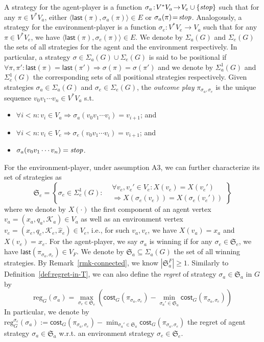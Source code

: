 \documentclass{ifacconf}
\def \K{\mathcal{K}}
\def \<{\langle}
\def \>{\rangle}
\def \stop{\emph{\text{stop}}}
\def \reg{\text{reg}}
\def \cost{\textsf{cost}}
\def \S{\mathfrak{S}}
\begin{document}
A strategy for the agent-player is a function 
$\sigma_a\!:\!  V^*V_a \!\to\! V_e \cup\{\stop\}$ 
such that for any $\pi \!\in\! V^*V_a$, either $\< \textsf{last}(\pi),\sigma_a(\pi) \>\!\in\! E$ or $\sigma_a(\pi)\!=\!\stop$.
Analogously, a strategy for the environment-player is a function $\sigma_e\!:\! V^*V_e\!\to\! V_a$ such that for any $\pi\!\in\! V^* V_e$, we have $\< \textsf{last}(\pi),\sigma_e(\pi) \>\!\in\! E$.
We denote by $\Sigma_a(G)$ and $\Sigma_e(G)$ the sets of all strategies for the agent and the environment respectively.
In particular, a strategy $\sigma\in\Sigma_a(G)\cup\Sigma_e(G)$ is said to be positional if $\forall \pi,\pi'\!:\!\textsf{last}(\pi)\!=\!\textsf{last}(\pi')\Rightarrow \sigma(\pi)\!=\!\sigma(\pi')$ and we denote by $\Sigma_a^1(G)$ and $\Sigma_e^1(G)$ the corresponding sets of all positional strategies respectively. 
Given strategies $\sigma_a\!\in\!\Sigma_a(G)$ and $\sigma_e\!\in\!\Sigma_e(G)$, the \emph{outcome play} $\pi_{\sigma_a,\sigma_e}$ is the unique sequence 
$v_0v_1\cdots v_n\!\in\! V^* V_a$ s.t.\
\begin{itemize}
    \item 
    $\forall i<n: v_i\in V_a \Rightarrow \sigma_a(v_0v_1\cdots v_i) =v_{i+1}$; and
    \item 
    $\forall i<n: v_i\in V_e\Rightarrow \sigma_e(v_0v_1\cdots v_i) =v_{i+1}$; and
    \item 
    $\sigma_a(v_0v_1\cdots v_n)=\stop$.  
\end{itemize}
For the environment-player, under assumption A3, we can further characterize its set of strategies as
\begin{equation}
    \S_e=\left\{
    \sigma_e\in\Sigma_e^1(G): 
    \begin{aligned}
    &\forall v_e,v_e'\in V_e:X(v_e)=X(v_e')\\
    &\Rightarrow X(\sigma_e(v_e))=X(\sigma_e(v_e'))
    \end{aligned}
    \right\}
\end{equation}
where we denote by $X(\cdot)$ the first component of an agent vertex $v_a\!=\!(x_a,q_a,\K_a)\!\in\! V_a$ as well as an environment vertex $v_e\!=\!(x_e,q_e,\K_e,\hat{x}_e)\!\in\!V_e$, i.e., for such $v_a,v_e$, we have $X(v_a)\!=\!x_a$ and $X(v_e)\!=\!x_e$.
For the agent-player, we say $\sigma_a$ is winning  if for any $\sigma_e\in\S_e$, we have $\textsf{last}(\pi_{\sigma_a,\sigma_e})\in V_F$. 
We denote by $\S_a\subseteq \Sigma_a(G)$ the set of all winning strategies. 
By Remark~\ref{rmk-connected}, we know $|\S_a^F|\geq 1$.
Similarly to Definition~\ref{def:regret-in-T}, we can also define the \emph{regret} of strategy $\sigma_a\!\in\!\S_a$ in $G$ by 
\begin{equation}\label{eq:reg-G}
    \reg_G(\sigma_a)\!=\!\!\!\max_{\sigma_e\in\S_e}\!\left(\! \cost_G (\pi_{\sigma_a,\sigma_e})-\min_{\sigma_a'\in\S_a}\!\!\!\cost_G(\pi_{\sigma_a,\sigma_e}) \!\!\right)
\end{equation} 
In particular, we denote by $\reg_G^{\sigma_e}(\sigma_a)\!:=\!\cost_G (\pi_{\sigma_a,\sigma_e})\!-\!\min_{\sigma_a'\in\S_a}\!\!\!\cost_G(\pi_{\sigma_a,\sigma_e})$ the regret of agent strategy $\sigma_a\!\in\!\S_a$ w.r.t. an environment strategy $\sigma_e\!\in\!\S_e$.
\end{document}
